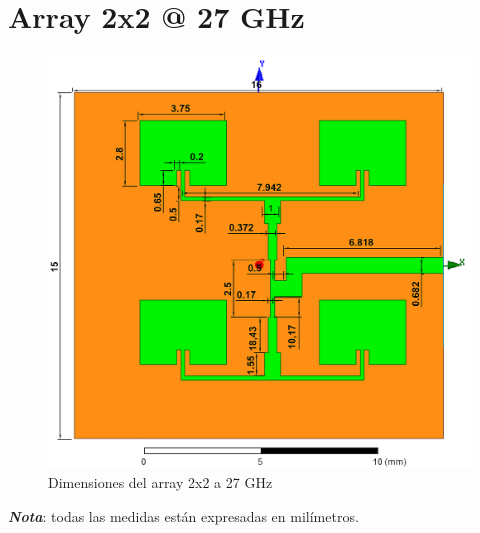 \section{Array 2x2 @ 27 GHz}
\vfill
\begin{figure}[H]
   	 \centering
        \includegraphics[width=\textwidth ,height=\textheight, keepaspectratio=true]{archivos/desarrollo/autocad/14}
        \caption{Dimensiones del array 2x2 a 27 GHz}
        \label{fig:2x23}
\end{figure}
\vfill
\textit{\textbf{Nota}}: todas las medidas están expresadas en milímetros.